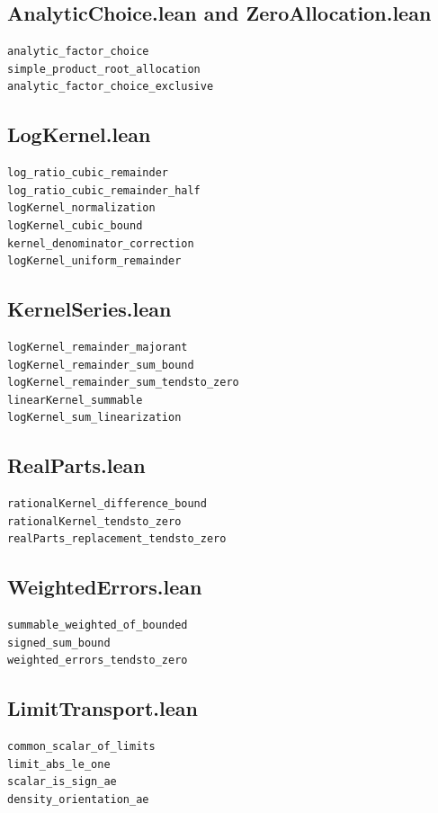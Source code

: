 \documentclass[11pt,a4paper]{article}
\begin{document}
\subsection*{AnalyticChoice.lean and ZeroAllocation.lean}
{\small\begin{verbatim}
analytic_factor_choice
simple_product_root_allocation
analytic_factor_choice_exclusive
\end{verbatim}}

\subsection*{LogKernel.lean}
{\small\begin{verbatim}
log_ratio_cubic_remainder
log_ratio_cubic_remainder_half
logKernel_normalization
logKernel_cubic_bound
kernel_denominator_correction
logKernel_uniform_remainder
\end{verbatim}}

\subsection*{KernelSeries.lean}
{\small\begin{verbatim}
logKernel_remainder_majorant
logKernel_remainder_sum_bound
logKernel_remainder_sum_tendsto_zero
linearKernel_summable
logKernel_sum_linearization
\end{verbatim}}

\subsection*{RealParts.lean}
{\small\begin{verbatim}
rationalKernel_difference_bound
rationalKernel_tendsto_zero
realParts_replacement_tendsto_zero
\end{verbatim}}

\subsection*{WeightedErrors.lean}
{\small\begin{verbatim}
summable_weighted_of_bounded
signed_sum_bound
weighted_errors_tendsto_zero
\end{verbatim}}

\subsection*{LimitTransport.lean}
{\small\begin{verbatim}
common_scalar_of_limits
limit_abs_le_one
scalar_is_sign_ae
density_orientation_ae
\end{verbatim}}
\end{document}
